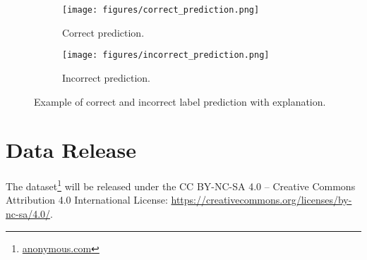 \begin{figure*}[tbh!]
    \centering
    \begin{subfigure}[b]{0.85\textwidth}
        \centering
        \texttt{[image: figures/correct\_prediction.png]}
        \caption{Correct prediction.}
        \label{fig:correct_prediction}
    \end{subfigure}
    \vspace{0.5cm}
    \begin{subfigure}[b]{0.85\textwidth}
        \centering
        \texttt{[image: figures/incorrect\_prediction.png]}
        \caption{Incorrect prediction.}
        \label{fig:incorrect_prediction}
    \end{subfigure}
    \caption{Example of correct and incorrect label prediction with explanation.}
    \label{fig:correct_incorrect_prediction}
\end{figure*}

\section{Data Release}
\label{apndix:release}
The \memex{} dataset\footnote{\url{anonymous.com}} will be released under the CC BY-NC-SA 4.0 -- Creative Commons Attribution 4.0 International License: \url{https://creativecommons.org/licenses/by-nc-sa/4.0/}.


